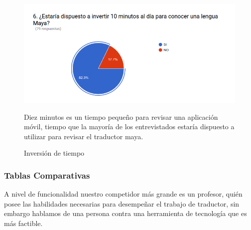 \documentclass[a4paper,openright,11pt]{article}
\begin{document}
\begin{figure}
	\includegraphics[width=1.0\textwidth]{e6}
	\caption{Inversión de tiempo}
	\label{fig:e6}
	Diez minutos es un tiempo pequeño para revisar una aplicación móvil, tiempo que la mayoría de los entrevistados estaría dispuesto a utilizar para revisar el traductor maya.
\end{figure}

\subsubsection{Tablas Comparativas}
\begin{table}[H]
\caption{Comparativa de Funcionalidades}
	A nivel de funcionalidad nuestro competidor más grande es un profesor, quién posee las habilidades necesarias para desempeñar el trabajo de traductor, sin embargo hablamos de una persona contra una herramienta de tecnología que es más factible.
\end{table}
\end{document}
